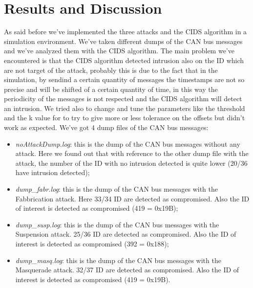 \documentclass[12pt]{article}
\begin{document}
\section{Results and Discussion}
As said before we've implemented the three attacks and the CIDS algorithm in a simulation environment.
We've taken different dumps of the CAN bus messages and we've analyzed them with the CIDS algorithm. 
The main problem we've encountered is that the CIDS algorithm detected intrusion also on the ID which are not 
target of the attack, probably this is due to the fact that in the simulation, by sendind a certain quantity of messages 
the timestamps are not so precise and will be shifted of a certain quantity of time, in this way the periodicity 
of the messages is not respected and the CIDS algorithm will detect an intrusion. We tried also to 
change and tune the parameters like the threshold and the k value for to try to give more or less tolerance on 
the offsets but didn't work as expected.
We've got 4 dump files of the CAN bus messages:
\begin{itemize}
    \item \textit{noAttackDump.log}: this is the dump of the CAN bus messages without any attack. 
    Here we found out that with reference to the other dump file with the attack, the number of the ID with no intrusion 
    detected is quite lower (20/36 have intrusion detected);
    \item \textit{dump\_fabr.log}: this is the dump of the CAN bus messages with the Fabbrication attack. Here 33/34 ID are 
    detected as compromised. Also the ID of interest is detected as compromised (419 = 0x19B);
    \item \textit{dump\_susp.log}: this is the dump of the CAN bus messages with the Suspension attack. 25/36 ID are detected 
    as compromised. Also the ID of interest is detected as compromised (392 = 0x188);
    \item \textit{dump\_masq.log}: this is the dump of the CAN bus messages with the Masquerade attack. 32/37 ID are detected 
    as compromised. Also the ID of interest is detected as compromised (419 = 0x19B).
\end{itemize}

\printbibliography 
\end{document}
